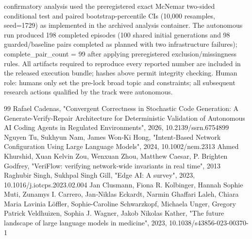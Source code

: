 \documentclass[conference]{IEEEtran}
\begin{document}
confirmatory analysis used the preregistered exact McNemar two-sided conditional test and paired bootstrap-percentile CIs (10,000 resamples, seed=1729) as implemented in the archived analysis container. The autonomous run produced 198 completed episodes (100 shared initial generations and 98 guarded/baseline pairs completed as planned with two infrastructure failures); complete\_pair\_count = 99 after applying preregistered exclusion/missingness rules. All artifacts required to reproduce every reported number are included in the released execution bundle; hashes above permit integrity checking. Human role: humans only set the pre-lock broad topic and constraints; all subsequent research actions qualified by the track were autonomous.

\begin{thebibliography}{99}
 Rafael Cadenas, "Convergent Correctness in Stochastic Code Generation: A Generate-Verify-Repair Architecture for Deterministic Validation of Autonomous AI Coding Agents in Regulated Environments", 2026, 10.2139/ssrn.6754899
 Nguyen Tu, Sukhyun Nam, James Won‐Ki Hong, "Intent‐Based Network Configuration Using Large Language Models", 2024, 10.1002/nem.2313
 Ahmed Khurshid, Xuan Kelvin Zou, Wenxuan Zhou, Matthew Caesar, P. Brighten Godfrey, "VeriFlow: verifying network-wide invariants in real time", 2013
 Raghubir Singh, Sukhpal Singh Gill, "Edge AI: A survey", 2023, 10.1016/j.iotcps.2023.02.004
 Jan Clusmann, Fiona R. Kolbinger, Hannah Sophie Muti, Zunamys I. Carrero, Jan‐Niklas Eckardt, Narmin Ghaffari Laleh, Chiara Maria Lavinia Löffler, Sophie-Caroline Schwarzkopf, Michaela Unger, Gregory Patrick Veldhuizen, Sophia J. Wagner, Jakob Nikolas Kather, "The future landscape of large language models in medicine", 2023, 10.1038/s43856-023-00370-1
\end{thebibliography}
\end{document}
